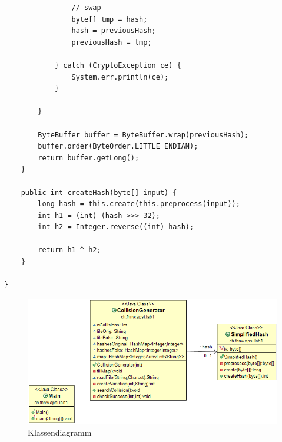 \documentclass[12pt]{scrartcl}
\begin{document}
\begin{lstlisting}
				// swap
				byte[] tmp = hash;
				hash = previousHash;
				previousHash = tmp;

			} catch (CryptoException ce) {
				System.err.println(ce);
			}

		}

		ByteBuffer buffer = ByteBuffer.wrap(previousHash);
		buffer.order(ByteOrder.LITTLE_ENDIAN);
		return buffer.getLong();
	}

	public int createHash(byte[] input) {
		long hash = this.create(this.preprocess(input));
		int h1 = (int) (hash >>> 32);
		int h2 = Integer.reverse((int) hash);

		return h1 ^ h2;
	}

}

\end{lstlisting}

\begin{figure} [h!]

\includegraphics[scale= 0.5]{apsi_lab.png}
\caption{Klassendiagramm}
\end{figure}

 
\end{document}
